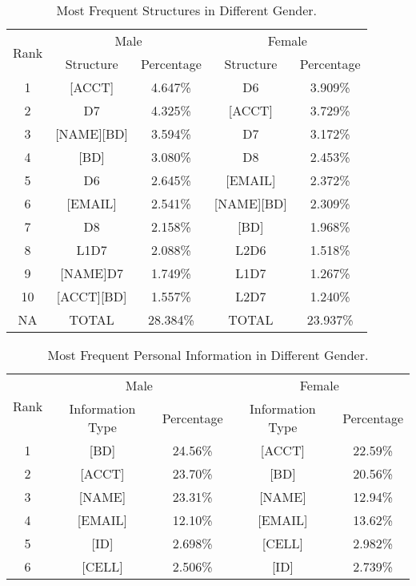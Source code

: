 \begin{table}
\centering
\caption{Most Frequent Structures in Different Gender.}
\begin{adjustbox}{max width=0.48\textwidth}
\begin{tabular}{|c|c|c|c|c|} \hline
\multirow{2}{*}{Rank}&\multicolumn{2}{|c|}{Male}&\multicolumn{2}{|c|}{Female}\\ \cline{2-5}
&Structure&Percentage&Structure&Percentage\\ \hline
1&[ACCT] & 4.647\%&D6 & 3.909\%\\
2&D7 & 4.325\%&[ACCT] & 3.729\%\\
3&[NAME][BD] & 3.594\%&D7 & 3.172\%\\
4&[BD] & 3.080\%&D8 & 2.453\%\\
5&D6 & 2.645\%&[EMAIL] & 2.372\%\\
6&[EMAIL] & 2.541\%&[NAME][BD] & 2.309\%\\
7&D8 & 2.158\%&[BD] & 1.968\%\\
8&L1D7 & 2.088\%&L2D6 & 1.518\%\\
9&[NAME]D7 & 1.749\%&L1D7 & 1.267\%\\
10&[ACCT][BD] & 1.557\%&L2D7 & 1.240\%\\ \hline
NA&TOTAL&28.384\%&TOTAL&23.937\%\\
\hline\end{tabular}
\end{adjustbox}
\label{t5}
\end{table}

\begin{table}
\centering
\caption{Most Frequent Personal Information in Different Gender.}
\begin{adjustbox}{max width=0.48\textwidth}
\begin{tabular}{|c|c|c|c|c|} \hline
\multirow{2}{*}{Rank}&\multicolumn{2}{|c|}{Male}&\multicolumn{2}{|c|}{Female}\\ \cline{2-5}
&Information Type&Percentage&Information Type&Percentage\\ \hline
1&[BD]&24.56\%&[ACCT]&22.59\%\\
2&[ACCT]&23.70\%&[BD]&20.56\%\\
3&[NAME]&23.31\%&[NAME]&12.94\%\\
4&[EMAIL]&12.10\%&[EMAIL]&13.62\%\\
5&[ID]&2.698\%&[CELL]&2.982\%\\
6&[CELL]&2.506\%&[ID]&2.739\%\\
\hline\end{tabular}
\end{adjustbox}
\label{t6}
\end{table}

